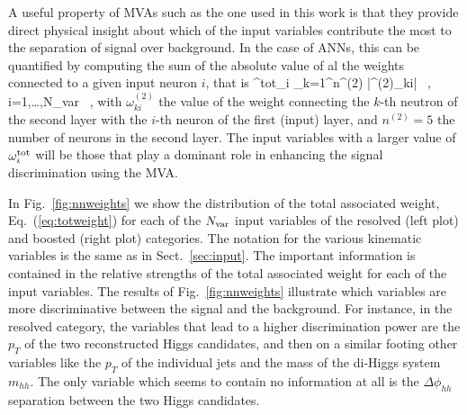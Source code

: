 A useful property of MVAs such as the one used in this work
is that they provide direct  physical insight about which of the
input variables contribute the most to the separation of
signal over background.
%
In the case of ANNs, this can be quantified by computing the sum
of the absolute value of al the weights connected to a given
input neuron $i$, that is
\be
\label{eq:totweight}
\omega^{\rm tot}_i \equiv \sum_{k=1}^{n^{(2)}} \Big|\omega^{(2)}_{ki}\Big| \, ,
\qquad i=1,\ldots,N_{\rm var} \, ,
\ee
with $\omega^{(2)}_{ki}$ the value of the weight connecting
the $k$-th neutron of the second layer with the $i$-th neuron of
the first (input) layer, and $n^{(2)}=5$ the number of
neurons in the second layer.
%
The input variables with a larger value of $\omega^{\rm tot}_i$ will be those
that play a dominant role in enhancing the signal
discrimination using the MVA.

%
In Fig.~\ref{fig:nnweights} we show
the distribution of the total associated weight,
Eq.~(\ref{eq:totweight}) for each of the $N_{\rm var}$ input
variables of the resolved (left plot) and boosted (right plot) categories.
%
The notation for the various kinematic variables is the same
as in Sect.~\ref{sec:input}.
%
The important information
is contained in the relative strengths of the total associated weight
for each of the input variables.
%
The results of Fig.~\ref{fig:nnweights} illustrate which variables
are more discriminative between the signal and the background.
%
For instance, in the 
resolved category, the variables that lead to
a higher discrimination power
are the $p_T$ of the two reconstructed Higgs candidates, and then on a similar
footing other variables like the $p_T$ of the individual jets
and the mass of the di-Higgs system $m_{hh}$.
%
The only variable which seems to contain no information at all
is the $\Delta \phi_{hh}$ separation between the two
Higgs candidates.


